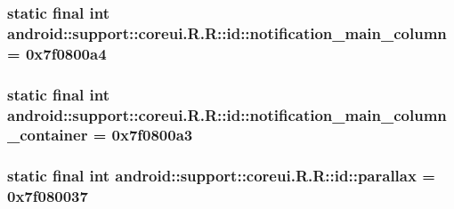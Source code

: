 \hypertarget{classandroid_1_1support_1_1coreui_1_1_r_1_1id_a33857ba6de19c98d1125cccc0d90be1}{
\subsubsection[{notification\_\-main\_\-column}]{\setlength{\rightskip}{0pt plus 5cm}static final int android::support::coreui.R.R::id::notification\_\-main\_\-column = 0x7f0800a4}}
\label{classandroid_1_1support_1_1coreui_1_1_r_1_1id_a33857ba6de19c98d1125cccc0d90be1}


\hypertarget{classandroid_1_1support_1_1coreui_1_1_r_1_1id_c475d65b259874da440ac0c491d87694}{
\subsubsection[{notification\_\-main\_\-column\_\-container}]{\setlength{\rightskip}{0pt plus 5cm}static final int android::support::coreui.R.R::id::notification\_\-main\_\-column\_\-container = 0x7f0800a3}}
\label{classandroid_1_1support_1_1coreui_1_1_r_1_1id_c475d65b259874da440ac0c491d87694}


\hypertarget{classandroid_1_1support_1_1coreui_1_1_r_1_1id_4f608ecfb307cad3a7e728af7615cdba}{
\subsubsection[{parallax}]{\setlength{\rightskip}{0pt plus 5cm}static final int android::support::coreui.R.R::id::parallax = 0x7f080037}}
\label{classandroid_1_1support_1_1coreui_1_1_r_1_1id_4f608ecfb307cad3a7e728af7615cdba}


